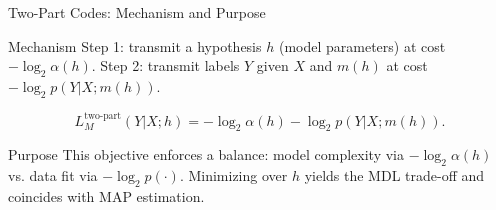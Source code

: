 \documentclass{beamer}
\begin{document}
\begin{frame}{Two-Part Codes: Mechanism and Purpose}
\small
\begin{block}{Mechanism}
Step 1: transmit a hypothesis $h$ (model parameters) at cost $-\log_2 \alpha(h)$.
Step 2: transmit labels $Y$ given $X$ and $m(h)$ at cost $-\log_2 p(Y|X;m(h))$.
\end{block}

$$
L^{\text{two-part}}_M(Y|X;h) = -\log_2 \alpha(h) - \log_2 p(Y|X;m(h)).
$$

\begin{block}{Purpose}
This objective enforces a balance: model complexity via $-\log_2\alpha(h)$ vs. data fit via $-\log_2 p(\cdot)$. Minimizing over $h$ yields the MDL trade-off and coincides with MAP estimation.
\end{block}
\end{frame}
\end{document}
